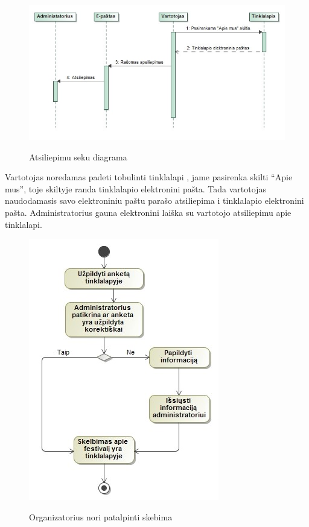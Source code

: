 ﻿\documentclass{VUMIFPSkursinis}
\begin{document}
\begin{figure}[H]
    \centering
    \includegraphics[scale=0.7]{img/geri/_klientasmintis}
    \label{img:uml10}
	\caption{Atsiliepimu seku diagrama}
\end{figure}

Vartotojas noredamas padeti tobulinti tinklalapi , jame pasirenka skilti “Apie mus”, toje skiltyje randa tinklalapio elektronini pašta. Tada vartotojas naudodamasis savo elektroniniu paštu parašo atsiliepima i tinklalapio elektronini pašta. Administratorius gauna elektronini laiška su vartotojo atsiliepimu apie tinklalapi. 

\begin{figure}[H]
    \centering
    \includegraphics[scale=0.7]{img/geri/festivalOrg}
    \label{img:uml11}
	\caption{Organizatorius nori patalpinti skebima}
\end{figure}
\end{document}
